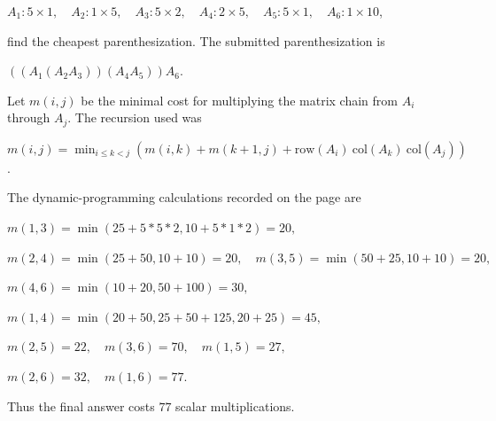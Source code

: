 \(A_{1}:5 \times 1,\quad A_{2}:1 \times 5,\quad A_{3}:5 \times 2,\quad A_{4}:2 \times 5,\quad A_{5}:5 \times 1,\quad A_{6}:1 \times 10\),

find the cheapest parenthesization. The submitted parenthesization is

\(\left( {\left( {A_{1}\left( {A_{2}A_{3}} \right)} \right)\left( {A_{4}A_{5}} \right)} \right)A_{6}\).

Let \(m\left( {i,j} \right)\) be the minimal cost for multiplying the matrix chain from \(A_{i}\) through \(A_{j}\). The recursion used was

\(m\left( {i,j} \right) = \min_{i \leq k < j}\left( {m\left( {i,k} \right) + m\left( {k + 1,j} \right) + \text{row}\left( A_{i} \right)\ \text{col}\left( A_{k} \right)\ \text{col}\left( A_{j} \right)} \right)\).

The dynamic-programming calculations recorded on the page are

\(m\left( {1,3} \right) = \min\left( {25 + 5 \ast 5 \ast 2,10 + 5 \ast 1 \ast 2} \right) = 20,\)

\(m\left( {2,4} \right) = \min\left( {25 + 50,10 + 10} \right) = 20,\quad m\left( {3,5} \right) = \min\left( {50 + 25,10 + 10} \right) = 20,\)

\(m\left( {4,6} \right) = \min\left( {10 + 20,50 + 100} \right) = 30,\)

\(m\left( {1,4} \right) = \min\left( {20 + 50,25 + 50 + 125,20 + 25} \right) = 45,\)

\(m\left( {2,5} \right) = 22,\quad m\left( {3,6} \right) = 70,\quad m\left( {1,5} \right) = 27,\)

\(m\left( {2,6} \right) = 32,\quad m\left( {1,6} \right) = 77.\)

Thus the final answer costs \(77\) scalar multiplications.
